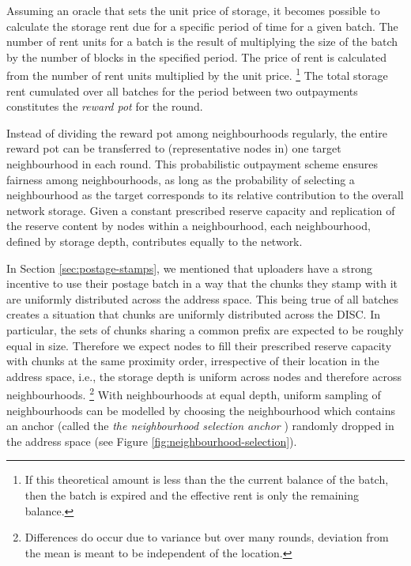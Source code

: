 Assuming an oracle that sets the unit price of storage, it becomes possible to calculate the storage rent due for a specific period of time for a given batch. The number of rent units for a batch is the result of multiplying the size of the batch by the number of blocks in the specified period. The price of rent is calculated from the number of rent units multiplied by the unit price.%
%
\footnote{If this theoretical amount is less than the the current balance of the batch, then the batch is expired and the effective rent is only the remaining balance.}
%
The total storage rent cumulated over all batches for the period between two outpayments constitutes the \emph{reward pot} for the round.

Instead of dividing the reward pot among neighbourhoods regularly, the entire reward pot can be transferred to (representative nodes in) one target neighbourhood in each round. This probabilistic outpayment scheme ensures fairness among neighbourhoods, as long as the probability of selecting a neighbourhood as the target corresponds to its relative contribution to the overall network storage. Given a constant prescribed reserve capacity and replication of the reserve content by nodes within a neighbourhood, each neighbourhood, defined by storage depth, contributes equally to the network. 

In Section \ref{sec:postage-stamps}, we mentioned that uploaders have a strong incentive to use their postage batch in a way that the chunks they stamp with it are uniformly distributed across the address space. This being true of all batches creates a situation that chunks are uniformly distributed across the DISC. In particular, the sets of chunks sharing a common prefix are expected to be roughly equal in size. Therefore we expect nodes to fill their prescribed reserve capacity with chunks at the same proximity order, irrespective of their location in the address space, i.e., the storage depth is uniform across  nodes and therefore across neighbourhoods.%
%
\footnote{Differences do occur due to variance but over many rounds, deviation from the mean is meant to be independent of the location.}
%
With neighbourhoods at equal depth, uniform sampling of neighbourhoods can be modelled by choosing the neighbourhood which contains an anchor (called the \emph{the neighbourhood selection anchor}%
%
%
) randomly dropped in the address space (see Figure \ref{fig:neighbourhood-selection}).


